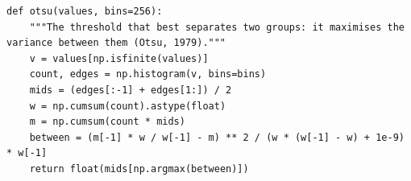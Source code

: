 \begin{lstlisting}[firstnumber=61]
def otsu(values, bins=256):
    """The threshold that best separates two groups: it maximises the variance between them (Otsu, 1979)."""
    v = values[np.isfinite(values)]
    count, edges = np.histogram(v, bins=bins)
    mids = (edges[:-1] + edges[1:]) / 2
    w = np.cumsum(count).astype(float)
    m = np.cumsum(count * mids)
    between = (m[-1] * w / w[-1] - m) ** 2 / (w * (w[-1] - w) + 1e-9) * w[-1]
    return float(mids[np.argmax(between)])
\end{lstlisting}
